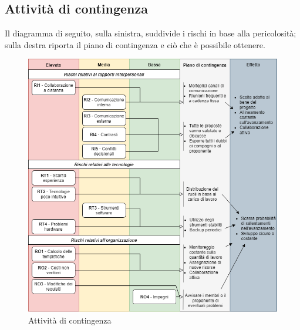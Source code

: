 \subsection{Attività di contingenza}

Il diagramma di seguito, sulla sinistra, suddivide i rischi in base alla pericolosità; sulla destra riporta il piano di contingenza e ciò che è possibile ottenere. 

\begin{figure}[!htb]
\includegraphics[width=17.5cm]{Images/rischi}
\caption{Attività di contingenza}
\end{figure}


